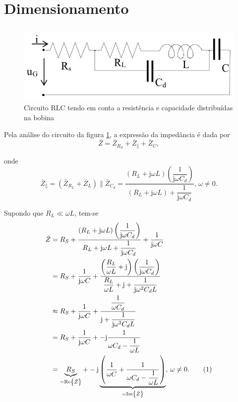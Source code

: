 \documentclass[a4paper, titlepage, portuguese]{article}
\newcommand\numberthis{\addtocounter{equation}{1}\tag{\theequation}}
\begin{document}

	\section{Dimensionamento}
	\subsection{}
		\begin{figure}[h]
			\centering
			\includegraphics[width=0.6\linewidth]{circuito2.png}
			\caption{Circuito RLC tendo em conta a resistência e capacidade distribuídas na bobina}
			\label{fig:circuito2}
		\end{figure}
		\par
		Pela análise do circuito da figura \ref{fig:circuito2}, a expressão da impedância é dada por
		\begin{equation}
			\bar{Z} = \bar{Z}_{R_S} + \bar{Z}_{\parallel} + \bar{Z}_C,
		\end{equation}
		\par
		onde
		\begin{equation}
			\bar{Z}_{\parallel} = (\bar{Z}_{R_L} + \bar{Z}_{L}) \parallel \bar{Z}_{C_d} = \dfrac{\left(R_L + \mathrm{j} \omega L\right)\left(\dfrac{1}{\mathrm{j} \omega C_d}\right)}{(R_L + \mathrm{j} \omega L) + \dfrac{1}{\mathrm{j} \omega C_d}}, \hspace{2pt}\omega \neq 0.
		\end{equation}
		\par
		Supondo que $R_L \ll \omega L$, tem-se
		\begin{align*}
			\bar{Z} &= R_S + \dfrac{\left(R_L + \mathrm{j} \omega L\right)\left(\dfrac{1}{\mathrm{j} \omega C_d}\right)}{R_L + \mathrm{j} \omega L + \dfrac{1}{\mathrm{j} \omega C_d}} + \dfrac{1}{\mathrm{j} \omega C} \\
			&= R_S + \dfrac{1}{\mathrm{j} \omega C} + \dfrac{\left(\dfrac{R_L}{\omega L} + \mathrm{j}\right)\left(\dfrac{1}{\mathrm{j} \omega C_d}\right)}{\dfrac{R_L}{\omega L} + \mathrm{j} + \dfrac{1}{\mathrm{j} \omega^2 C_d L}} \\
			&\approx R_S + \dfrac{1}{\mathrm{j} \omega C} + \dfrac{\dfrac{1}{\omega C_d}}{\mathrm{j} + \dfrac{1}{\mathrm{j} \omega^2 C_d L}} \nonumber \\
			&= R_S + \dfrac{1}{\mathrm{j} \omega C} + -\mathrm{j}\dfrac{1}{\omega C_d - \dfrac{1}{\omega L}} \\
			&= \underbrace{R_S}_{=\Re{\bar{Z}}} + -\mathrm{j}\underbrace{\left(\dfrac{1}{\omega C} + \dfrac{1}{\omega C_d - \dfrac{1}{\omega L}}\right)}_{=\Im{\bar{Z}}}, \hspace{2pt}\omega \neq 0. \numberthis \\
		\end{align*}
\end{document}
